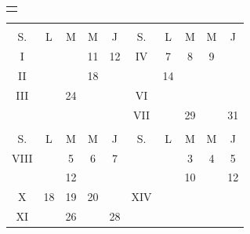 \documentclass[11.9pt,letterpaper]{article}
\begin{document}
\begin{multicols}{2}
\begin{table}[H]
\begin{tabular}{|l|l|c|}
\end{tabular}
\end{table}
\newpage
\hspace*{0.5cm} 
\begin{center}
\begin{tabular}{c}
\cellcolor{gray!40}{PROGRAMACIÓN}
\end{tabular}
\end{center}
\begin{center}
\begin{tabular}{ccccc|ccccc}
\multicolumn{5}{c|}{\cellcolor{red!40}{SEPTIEMBRE}}&\multicolumn{5}{c}{\cellcolor{blue!40}{OCTUBRE}}\\
S.&L&M&M&J&S.&L&M&M&J\\
I &\cellcolor{gray!40}{9}&\cellcolor{gray!40}{10}&11&12&IV&7&8&9&\cellcolor{white}{10}\\
II&\cellcolor{gray!40}{16}&\cellcolor{gray!40}{17}&18&\cellcolor{white}{19}&\cellcolor{VIRTUAL}{V}&14&\cellcolor{gray!40}{15}&\cellcolor{EXAMEN}{$16\textcolor{TAREA}{\blacksquare}$}&\cellcolor{white}{17}\\
III&\cellcolor{white}{23}&24&\cellcolor{EXAMEN}{25}&\cellcolor{white}{26}&VI&\cellcolor{white}{21}&\cellcolor{white}{22}&\cellcolor{white}{23}&\cellcolor{white}{24}\\
&&&&&VII&\cellcolor{white}{28}&29&\cellcolor{EXAMEN}{30}&31\\
\multicolumn{5}{c|}{\cellcolor{cyan!40}{NOVIEMBRE}}&\multicolumn{5}{c}{\cellcolor{green!40}{DICIEMBRE}}\\
S.&L&M&M&J&S.&L&M&M&J\\
VIII&\cellcolor{white}{4}&5&6&7&\cellcolor{white}{XII}&\cellcolor{white}{2}&3&4&5\\
\cellcolor{VIRTUAL}{IX}&\cellcolor{white}{11}&12&\cellcolor{EXAMEN}{$13\textcolor{TAREA}{\blacksquare}$}&\cellcolor{white}{14}&\cellcolor{VIRTUAL}{XIII}&\cellcolor{white}{9}&10&\cellcolor{EXAMEN}{$11\textcolor{TAREA}{\blacksquare}$}&12\\
X&18&19&20&\cellcolor{white}{21}&XIV&\cellcolor{gray!40}{16}&\cellcolor{gray!40}{17}&\cellcolor{gray!40}{18}&\\
XI&\cellcolor{white}{25}&26&\cellcolor{EXAMEN}{27}&28&&&&&\\
\end{tabular} 
\end{center}
\begin{center}
\begin{tabular}{lp{}}

\end{tabular}
\end{center}
\end{multicols}
\end{document}
